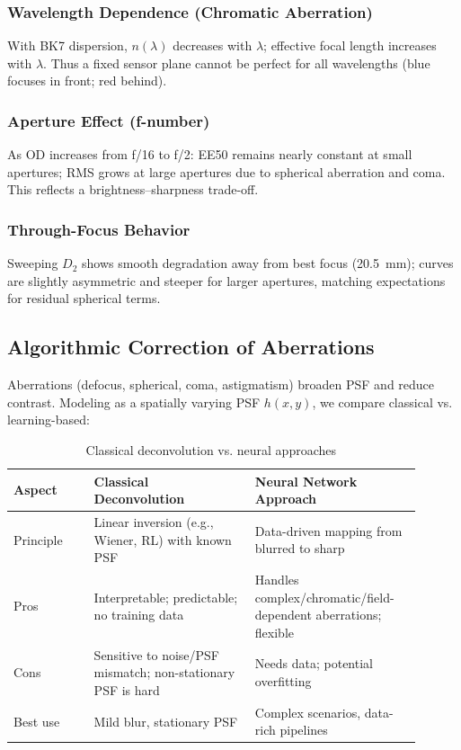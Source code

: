 \documentclass[11pt,a4paper]{article}
\begin{document}
	\subsubsection*{Wavelength Dependence (Chromatic Aberration)}
	
	With BK7 dispersion, \(n(\lambda)\) decreases with \(\lambda\); effective focal length increases with \(\lambda\).
	Thus a fixed sensor plane cannot be perfect for all wavelengths (blue focuses in front; red behind).
	
	\subsubsection*{Aperture Effect (f-number)}
	
	As OD increases from f/16 to f/2:
	EE50 remains nearly constant at small apertures;
	RMS grows at large apertures due to spherical aberration and coma.
	This reflects a brightness--sharpness trade-off.
	
	\subsubsection*{Through-Focus Behavior}
	
	Sweeping \(D_2\) shows smooth degradation away from best focus (\SI{20.5}{mm}); curves are slightly asymmetric and steeper for larger apertures, matching expectations for residual spherical terms.
	
	\subsection{Algorithmic Correction of Aberrations}
	
	Aberrations (defocus, spherical, coma, astigmatism) broaden PSF and reduce contrast. Modeling as a spatially varying PSF \(h(x,y)\), we compare classical vs. learning-based:
	\begin{table}[H]
		\centering
		\caption{Classical deconvolution vs. neural approaches}
		\begin{tabular}{p{0.18\linewidth} p{0.36\linewidth} p{0.36\linewidth}}
			\toprule
			\textbf{Aspect} & \textbf{Classical Deconvolution} & \textbf{Neural Network Approach}\\
			\midrule
			Principle & Linear inversion (e.g., Wiener, RL) with known PSF & Data-driven mapping from blurred to sharp \\
			Pros & Interpretable; predictable; no training data & Handles complex/chromatic/field-dependent aberrations; flexible \\
			Cons & Sensitive to noise/PSF mismatch; non-stationary PSF is hard & Needs data; potential overfitting \\
			Best use & Mild blur, stationary PSF & Complex scenarios, data-rich pipelines \\
			\bottomrule
		\end{tabular}
	\end{table}
	
\end{document}
